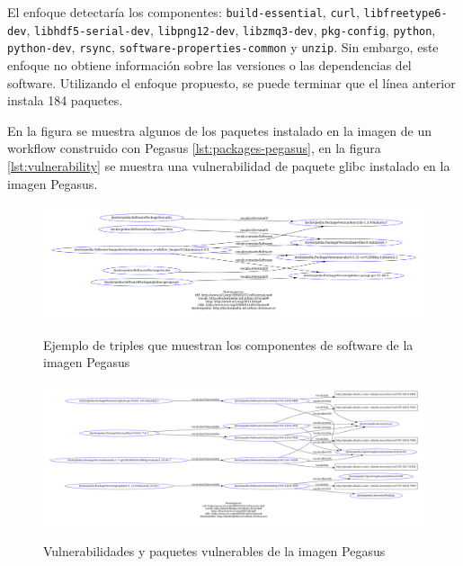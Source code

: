 El enfoque detectaría los componentes: \verb|build-essential|, \verb|curl|, \verb|libfreetype6-dev|, \verb|libhdf5-serial-dev|, \verb|libpng12-dev|, \verb|libzmq3-dev|, \verb|pkg-config|, \verb|python|, \verb|python-dev|, \verb|rsync|, \verb|software-properties-common| y  \verb|unzip|. Sin embargo, este enfoque no obtiene información sobre las versiones o las dependencias del software. Utilizando el  enfoque propuesto, se puede terminar que el línea anterior instala 184 paquetes.

En la figura se muestra algunos de los paquetes instalado en la imagen de un workflow construido con Pegasus \ref{lst:packages-pegasus}, en la figura \ref{lst:vulnerability} se muestra una vulnerabilidad de paquete glibc instalado en la imagen Pegasus.


\begin{figure}
    \hspace*{-4cm}    \includegraphics[width=1.3\textwidth]{Figures/packages}
    \label{fig:ontology}
      \caption{Ejemplo de triples que muestran los componentes de software de la imagen Pegasus}
\end{figure}



\begin{figure}
    \hspace*{-4cm}    \includegraphics[width=1.3\textwidth]{Figures/packages-vuln}
    \label{fig:ontology}
      \caption{Vulnerabilidades y paquetes vulnerables de la imagen Pegasus}
\end{figure}
